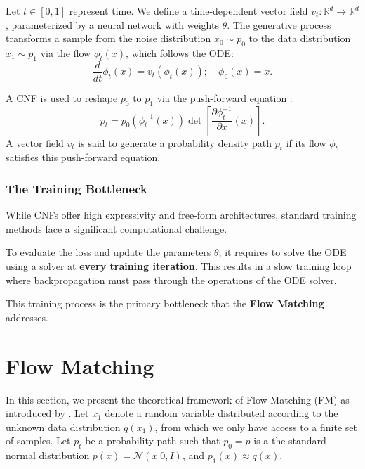 \documentclass{article}
\begin{document}
Let $t \in [0, 1]$ represent time. We define a time-dependent vector field $v_t: \mathbb{R}^d \to \mathbb{R}^d$, parameterized by a neural network with weights $\theta$. The generative process transforms a sample from the noise distribution $x_0 \sim p_0$ to the data distribution $x_1 \sim p_1$ via the flow $\phi_t(x)$, which follows the ODE:
\begin{equation}
    \frac{d}{dt} \phi_t(x) = v_t(\phi_t(x)); \quad \phi_0(x) = x.
    \label{eq:cnf_ode}
\end{equation}

A CNF is used to reshape $p_0$ to $p_1$ via the push-forward equation :
\begin{equation}\label{e:push_forward}
p_t = p_0(\phi_t^{-1}(x))\det \left[ \frac{\partial \phi_t^{-1}}{\partial x}(x) \right].
\end{equation}
A vector field $v_t$ is said to generate a probability density path $p_t$ if its flow $\phi_t$ satisfies this push-forward equation.


\subsubsection{The Training Bottleneck}
While CNFs offer high expressivity and free-form architectures, standard training methods face a significant computational challenge.

To evaluate the loss and update the parameters $\theta$, it requires to solve the ODE using a solver at \textbf{every training iteration}. This results in a slow training loop where backpropagation must pass through the operations of the ODE solver.

This training process is the primary bottleneck that the \textbf{Flow Matching} addresses.


\section{Flow Matching}

In this section, we present the theoretical framework of Flow Matching (FM) as introduced by \cite{lipman2023flowmatchinggenerativemodeling}.
Let $x_1$ denote a random variable distributed according to the unknown data distribution $q(x_1)$, from which we only have access to a finite set of samples.
Let $p_t$ be a probability path such that $p_0=p$ is a the standard normal distribution $p(x) = \mathcal{N}(x | 0, I)$, and $p_1(x) \approx q(x)$. \\
\end{document}
